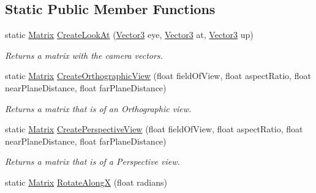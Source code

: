 \subsection*{Static Public Member Functions}
\begin{DoxyCompactItemize}
\item 
\hypertarget{struct_jade_1_1_math_1_1_matrix_ad463c28a746f11e6e39bce0c3c8bae7d}{}static \hyperlink{struct_jade_1_1_math_1_1_matrix}{Matrix} \hyperlink{struct_jade_1_1_math_1_1_matrix_ad463c28a746f11e6e39bce0c3c8bae7d}{Create\+Look\+At} (\hyperlink{struct_jade_1_1_math_1_1_vector3}{Vector3} eye, \hyperlink{struct_jade_1_1_math_1_1_vector3}{Vector3} at, \hyperlink{struct_jade_1_1_math_1_1_vector3}{Vector3} up)\label{struct_jade_1_1_math_1_1_matrix_ad463c28a746f11e6e39bce0c3c8bae7d}

\begin{DoxyCompactList}\small\item\em Returns a matrix with the camera vectors. \end{DoxyCompactList}\item 
\hypertarget{struct_jade_1_1_math_1_1_matrix_ae3ea05edfb34a8fef4453e96c830b994}{}static \hyperlink{struct_jade_1_1_math_1_1_matrix}{Matrix} \hyperlink{struct_jade_1_1_math_1_1_matrix_ae3ea05edfb34a8fef4453e96c830b994}{Create\+Orthographic\+View} (float field\+Of\+View, float aspect\+Ratio, float near\+Plane\+Distance, float far\+Plane\+Distance)\label{struct_jade_1_1_math_1_1_matrix_ae3ea05edfb34a8fef4453e96c830b994}

\begin{DoxyCompactList}\small\item\em Returns a matrix that is of an Orthographic view. \end{DoxyCompactList}\item 
\hypertarget{struct_jade_1_1_math_1_1_matrix_a2ee438ed4038bb5565050054308c80a9}{}static \hyperlink{struct_jade_1_1_math_1_1_matrix}{Matrix} \hyperlink{struct_jade_1_1_math_1_1_matrix_a2ee438ed4038bb5565050054308c80a9}{Create\+Perspective\+View} (float field\+Of\+View, float aspect\+Ratio, float near\+Plane\+Distance, float far\+Plane\+Distance)\label{struct_jade_1_1_math_1_1_matrix_a2ee438ed4038bb5565050054308c80a9}

\begin{DoxyCompactList}\small\item\em Returns a matrix that is of a Perspective view. \end{DoxyCompactList}\item 
\hypertarget{struct_jade_1_1_math_1_1_matrix_abcab7ae42a87d52a30e33e9c0ffc271a}{}static \hyperlink{struct_jade_1_1_math_1_1_matrix}{Matrix} \hyperlink{struct_jade_1_1_math_1_1_matrix_abcab7ae42a87d52a30e33e9c0ffc271a}{Rotate\+Along\+X} (float radians)\label{struct_jade_1_1_math_1_1_matrix_abcab7ae42a87d52a30e33e9c0ffc271a}


\end{DoxyCompactItemize}
